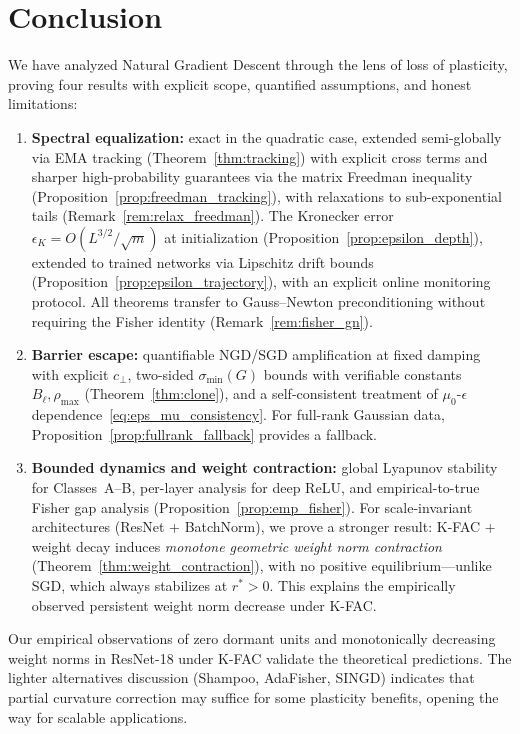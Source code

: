 \documentclass{article}
\theoremstyle{plain}
\theoremstyle{definition}
\theoremstyle{remark}
\begin{document}
\section{Conclusion}
\label{sec:conclusion}

We have analyzed Natural Gradient Descent through the lens of loss of plasticity, proving four results with explicit scope, quantified assumptions, and honest limitations:
\begin{enumerate}
    \item \textbf{Spectral equalization:} exact in the quadratic case, extended semi-globally via EMA tracking (Theorem~\ref{thm:tracking}) with explicit cross terms and sharper high-probability guarantees via the matrix Freedman inequality (Proposition~\ref{prop:freedman_tracking}), with relaxations to sub-exponential tails (Remark~\ref{rem:relax_freedman}). The Kronecker error $\epsilon_K = O(L^{3/2}/\sqrt{m})$ at initialization (Proposition~\ref{prop:epsilon_depth}), extended to trained networks via Lipschitz drift bounds (Proposition~\ref{prop:epsilon_trajectory}), with an explicit online monitoring protocol. All theorems transfer to Gauss--Newton preconditioning without requiring the Fisher identity (Remark~\ref{rem:fisher_gn}).
    \item \textbf{Barrier escape:} quantifiable NGD/SGD amplification at fixed damping with explicit $c_\perp$, two-sided $\sigma_{\min}(G)$ bounds with verifiable constants $B_\ell, \rho_{\max}$ (Theorem~\ref{thm:clone}), and a self-consistent treatment of $\mu_0$-$\epsilon$ dependence~\eqref{eq:eps_mu_consistency}. For full-rank Gaussian data, Proposition~\ref{prop:fullrank_fallback} provides a fallback.
    \item \textbf{Bounded dynamics and weight contraction:} global Lyapunov stability for Classes~A--B, per-layer analysis for deep ReLU, and empirical-to-true Fisher gap analysis (Proposition~\ref{prop:emp_fisher}). For scale-invariant architectures (ResNet + BatchNorm), we prove a stronger result: K-FAC + weight decay induces \emph{monotone geometric weight norm contraction} (Theorem~\ref{thm:weight_contraction}), with no positive equilibrium---unlike SGD, which always stabilizes at $r^* > 0$. This explains the empirically observed persistent weight norm decrease under K-FAC.
\end{enumerate}
Our empirical observations of zero dormant units and monotonically decreasing weight norms in ResNet-18 under K-FAC validate the theoretical predictions. The lighter alternatives discussion (Shampoo, AdaFisher, SINGD) indicates that partial curvature correction may suffice for some plasticity benefits, opening the way for scalable applications.
\end{document}
